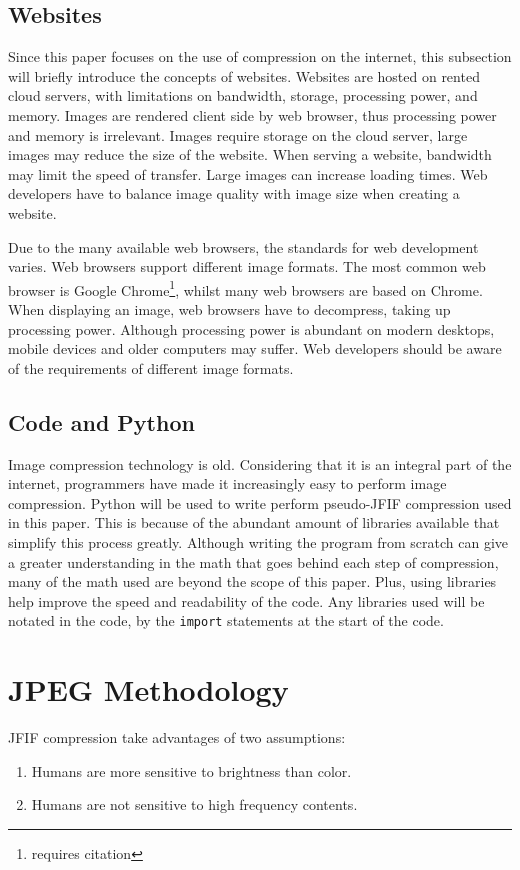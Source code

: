 \documentclass{article}
\begin{document}
\subsection{Websites}
Since this paper focuses on the use of compression on the internet, this subsection will briefly introduce the concepts of websites.
Websites are hosted on rented cloud servers, with limitations on bandwidth, storage, processing power, and memory.
Images are rendered client side by web browser, thus processing power and memory is irrelevant.
Images require storage on the cloud server, large images may reduce the size of the website.
When serving a website, bandwidth may limit the speed of transfer.
Large images can increase loading times.
Web developers have to balance image quality with image size when creating a website.

Due to the many available web browsers, the standards for web development varies.
Web browsers support different image formats.
The most common web browser is Google Chrome\footnote{requires citation}, whilst many web browsers are based on Chrome.
When displaying an image, web browsers have to decompress, taking up processing power.
Although processing power is abundant on modern desktops, mobile devices and older computers may suffer.
Web developers should be aware of the requirements of different image formats.

\subsection{Code and Python}
Image compression technology is old.
Considering that it is an integral part of the internet, programmers have made it increasingly easy to perform image compression.
Python will be used to write perform pseudo-JFIF compression used in this paper.
This is because of the abundant amount of libraries available that simplify this process greatly.
Although writing the program from scratch can give a greater understanding in the math that goes behind each step of compression, many of the math used are beyond the scope of this paper.
Plus, using libraries help improve the speed and readability of the code.
Any libraries used will be notated in the code, by the \texttt{import} statements at the start of the code.

\section{JPEG Methodology}

JFIF compression take advantages of two assumptions:~\autocite{jpegCornell}
\begin{enumerate}
	\item Humans are more sensitive to brightness than color.
	\item Humans are not sensitive to high frequency contents.
\end{enumerate}
\end{document}
